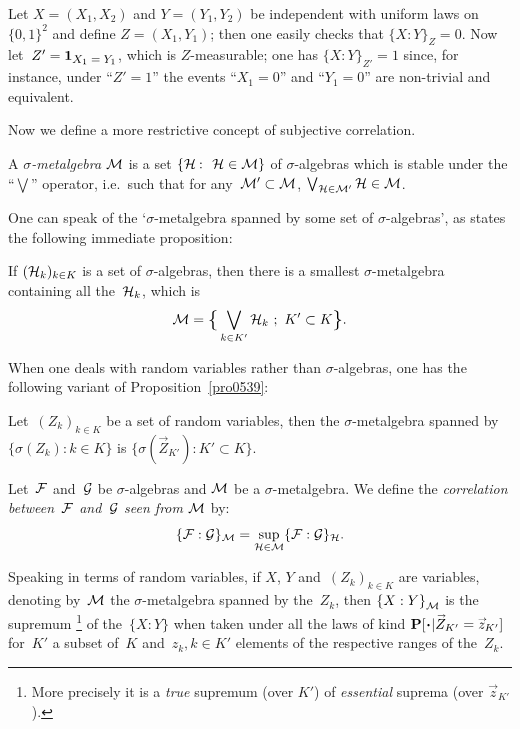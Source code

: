 \begin{Xpl}\label{xpl3450}
Let $X=(X_1,X_2)$ and $Y=(Y_1,Y_2)$ be independent with uniform laws
on~$\{0,1\}^2$ and define $Z=(X_1,Y_1)$;
then one easily checks that ${\{X:Y\}}_Z=0$.
Now let~$Z'=\1{X_1=Y_1}$, which is $Z$-measurable;
one has ${\{X:Y\}}_{Z'}=1$ since, for instance,
under ``$Z'=1$'' the events ``$X_1=0$'' and ``$Y_1=0$''
are non-trivial and equivalent.
\end{Xpl}

Now we define a more restrictive concept of subjective correlation.
%
\begin{Def}
A \emph{$\sigma$-metalgebra} $\mathcal{M}$ is a set $\{\mcal{H}\colon \mcal{H}\in\mcal{M}\}$
of $\sigma$-algebras which is stable under the ``$\bigvee$'' operator,
i.e.\ such that for any~$\mathcal{M}'\subset\mathcal{M}$, $\bigvee_{\mathcal{H}\in\mathcal{M}'}\mathcal{H}\in\mathcal{M}$.
\end{Def}

One can speak of the `$\sigma$-metalgebra spanned by some set of $\sigma$-algebras',
as states the following immediate proposition:
%
\begin{Pro}\label{pro0539}
If $(\mathcal{H}_k)_{k\in K}$ is a set of $\sigma$-algebras, then there is a smallest
$\sigma$-metalgebra containing all the~$\mathcal{H}_k$, which is
\[ \mcal{M} = \Big\{ \bigvee_{k\in K'} \mcal{H}_k \ ;\ K'\subset K \Big\} .\]
\end{Pro}

When one deals with random variables rather than $\sigma$-algebras,
one has the following variant of Proposition~\ref{pro0539}:
%
\begin{Pro}\label{cor0780}
Let~$(Z_k)_{k\in K}$ be a set of random variables,
then the $\sigma$-metalgebra spanned by~$\{\sigma(Z_k) \colon k\in K\}$
is $\{\sigma(\vec{Z}_{K'})\colon K'\subset K\}$.
\end{Pro}

\begin{Def}
Let~$\mathcal{F}$ and~$\mathcal{G}$ be $\sigma$-algebras and $\mathcal{M}$ be a $\sigma$-metalgebra.
We define the \emph{correlation between~$\mathcal{F}$ and~$\mathcal{G}$ seen from $\mathcal{M}$} by:
\[ \{\mathcal{F}:\mathcal{G}\}_{\mathcal{M}} = \sup_{\mathcal{H}\in\mathcal{M}} \{\mathcal{F}:\mathcal{G}\}_{\mathcal{H}} .\]
\end{Def}

\begin{Rmk}
Speaking in terms of random variables, if $X$, $Y$ and~$(Z_k)_{k\in K}$ are variables,
denoting by~$\mathcal{M}$ the $\sigma$-metalgebra spanned by the~$Z_k$,
then ${\{X:Y\}}_{\mathcal{M}}$ is the supremum%
\footnote{More precisely it is a \emph{true} supremum (over $K'$)
of \emph{essential} suprema (over $\vec{z}_{K'}$).}
of the~${\{X:Y\}}$ when taken under all the laws
of kind $\Pr[\Bcdot|\vec{Z}_{K'}=\vec{z}_{K'}]$ for~$K'$ a subset of~$K$
and~$z_k, k\in K'$ elements of the respective ranges of the~$Z_k$.
\end{Rmk}

